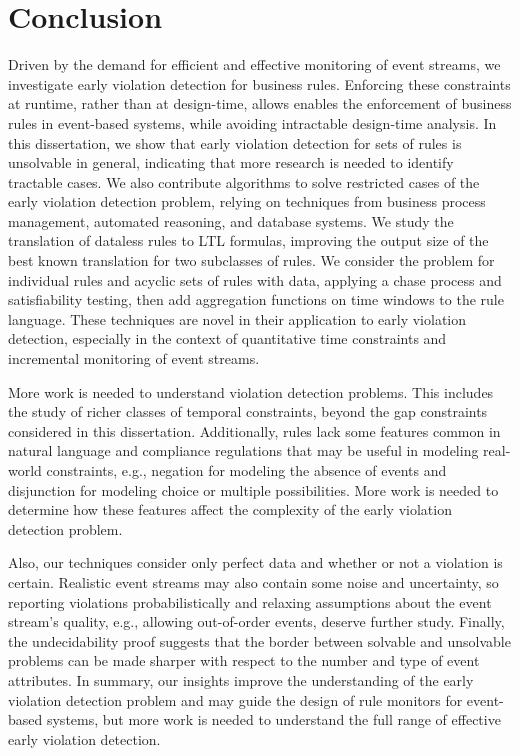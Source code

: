\chapter{Conclusion}
\label{chapter:conclusion}

Driven by the demand for 
efficient and effective monitoring of event streams,
we investigate
early violation detection for business rules.
Enforcing these constraints
at runtime,
rather than at design-time,
allows enables the enforcement
of business rules in event-based systems,
while avoiding intractable design-time analysis.
In this dissertation,
we show that
early violation detection for sets of rules is unsolvable in general,
indicating that more research
is needed to identify tractable cases.
We also contribute
algorithms to solve restricted cases
of the early violation detection problem,
relying on techniques from
business process management, automated reasoning,
and database systems.
We study the translation of dataless rules to LTL formulas,
improving the output size of the best known translation
for two subclasses of rules.
We consider the problem for individual rules and
acyclic sets of rules with data,
applying a chase process and satisfiability testing,
then add aggregation functions on time windows to the rule language.
These techniques are novel in their application to early violation detection, especially in the context of quantitative time constraints
and incremental monitoring of event streams. 

More work is needed to understand
violation detection problems.
This includes
the study of richer classes of temporal constraints,
beyond the gap constraints considered in this dissertation.
Additionally,
rules lack some features common in natural language and compliance regulations
that may be useful in modeling real-world constraints,
e.g.,
negation for modeling the absence of events
and
disjunction for modeling choice or multiple possibilities.
More work is needed
to determine how these features affect the complexity of the early violation detection problem.

Also,
our techniques consider only perfect data 
and
whether or not a violation is certain.
Realistic event streams
may also contain some noise and uncertainty,
so reporting violations probabilistically
and 
relaxing assumptions about the event stream's quality,
e.g., allowing out-of-order events,
deserve further study.
Finally,
the undecidability proof suggests that
the border between solvable and unsolvable problems
can be made sharper
with respect to the number and type of event attributes.
In summary,
our insights improve
the understanding of the early violation detection problem
and may guide the design of rule monitors for event-based systems,
but more work is needed
to understand the full range of effective early violation detection.